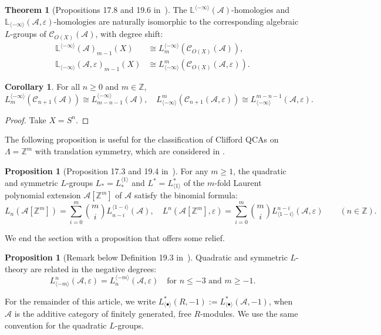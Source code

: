 \documentclass{article}
\theoremstyle{definition}
\newtheorem{cor}[theorem]{Corollary}
\newtheorem{prop}[theorem]{Proposition}
\newtheorem{thm}{Theorem}
\newcommand{\A}{\mathcal A}
\begin{document}
\begin{thm}[Propositions 17.8 and 19.6 in~\cite{ranicki1992lower}]\label{thm:Lmain2}
The \( \mathbb{L}^{\langle -\infty \rangle}(\mathcal{A}) \)-homologies and \( \mathbb{L}_{\langle -\infty \rangle}(\mathcal{A}, \varepsilon) \)-homologies are naturally isomorphic to the corresponding algebraic \( L \)-groups of \( \mathcal{C}_{O(X)}(\mathcal{A}) \), with degree shift:
\begin{align}
    \mathbb{L}^{\langle -\infty \rangle}(\mathcal{A})_{m-1}(X) &\cong L_m^{\langle -\infty \rangle}(\mathcal{C}_{O(X)}(\mathcal{A})),\\
 \mathbb{L}_{\langle -\infty \rangle}(\mathcal{A}, \varepsilon)_{m-1}(X) &\cong L^m_{\langle -\infty \rangle}(\mathcal{C}_{O(X)}(\mathcal{A}, \varepsilon)).
\end{align}


\end{thm}

\begin{cor}
For all \( n \geq 0 \) and \( m \in \mathbb{Z} \),
\[
L_m^{\langle -\infty \rangle}(\mathcal{C}_{n+1}(\mathcal{A})) \cong L_{m-n-1}^{\langle -\infty \rangle}(\mathcal{A}), \quad
L^m_{\langle -\infty \rangle}(\mathcal{C}_{n+1}(\mathcal{A}, \varepsilon)) \cong L^{m-n-1}_{\langle -\infty \rangle}(\mathcal{A}, \varepsilon).
\]
\end{cor}

\begin{proof}
Take \( X = S^n \).
\end{proof}

The following proposition is useful for the classification of Clifford QCAs on \( \Lambda = \mathbb{Z}^m \) with translation symmetry, which are considered in \cite{haah2025topological}.

\begin{prop}[Proposition 17.3 and 19.4  in~\cite{ranicki1992lower}]\label{prop:binomial}
For any \( m \geq 1 \), the quadratic and symmetric \( L \)-groups \( L_* = L_*^{\langle 1 \rangle} \) and \( L^* = L^*_{\langle 1 \rangle} \) of the \( m \)-fold Laurent polynomial extension \( \mathcal{A}[\mathbb{Z}^m] \) of \( \mathcal{A} \) satisfy the binomial formula:
\[
L_n(\mathcal{A}[\mathbb{Z}^m]) = \sum_{i=0}^m \binom{m}{i} L_{n-i}^{\langle 1-i \rangle}(\mathcal{A}), \quad
L^n(\mathcal{A}[\mathbb{Z}^m], \varepsilon) = \sum_{i=0}^m \binom{m}{i} L^{n-i}_{\langle 1-i \rangle}(\mathcal{A}, \varepsilon) \qquad (n \in \mathbb{Z}).
\]
\end{prop}
We end the section with a proposition that offers some relief.
\begin{prop}[Remark below Definition 19.3 in~\cite{ranicki1992lower}]\label{prop:quad2sym}
Quadratic and symmetric $L$-theory are related in the negative degrees:
    $$L^n_{\langle -m\rangle}(\A, \varepsilon) = L_n^{\langle -m\rangle}(\A, \varepsilon) \quad \text{for } n \leq -3 \text{ and } m\geq -1.$$
\end{prop}
For the remainder of this article, we write $L^{*}_{\langle \bullet \rangle}(R,-1):=L^{*}_{\langle \bullet \rangle}(\mathcal A,-1)$, when $\mathcal A$ is the additive category of finitely generated, free $R$-modules. We use the same convention for the quadratic $L$-groups.
\end{document}
